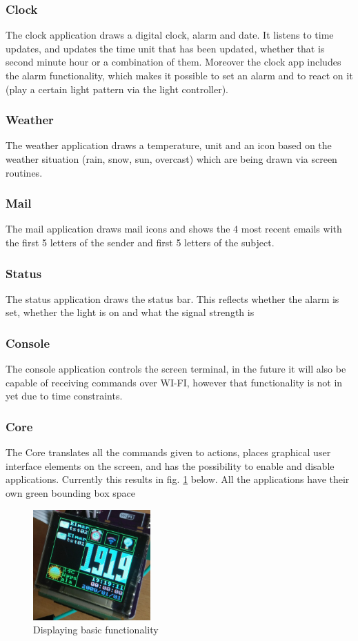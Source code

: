 \subsubsection{Clock}
The clock application draws a digital clock, alarm and date. It listens to time
updates, and updates the time unit that has been updated, whether that is second
minute hour or a combination of them. Moreover the clock app includes the alarm
functionality, which makes it possible to set an alarm and to react on it (play
a certain light pattern via the light controller). 
\subsubsection{Weather}
The weather application draws a temperature, unit and an icon based on the weather situation (rain, snow, sun, overcast) which are being drawn via screen routines. 
\subsubsection{Mail}
The mail application draws mail icons and shows the 4 most recent emails with the first 5 letters of the sender and first 5 letters of the subject.
\subsubsection{Status}
The status application draws the status bar. This reflects whether the alarm is set, whether the light is on and what the signal strength is
\subsubsection{Console}
The console application controls the screen terminal, in the future it will also be capable of receiving commands over WI-FI, however that functionality is not in yet due to time constraints.
\subsubsection{Core}
The Core translates all the commands given to actions, places graphical user interface elements on the screen, and has the possibility to enable and disable applications. Currently this results in fig. \ref{fig:clock_weather} below. All the applications have their own green bounding box space
\begin{figure}[H]
	\centering
	\label{fig:clock_weather}
	\includegraphics[width=0.4\textwidth]{./fig/clock_weather.png}
	\caption{Displaying basic functionality}
\end{figure}
